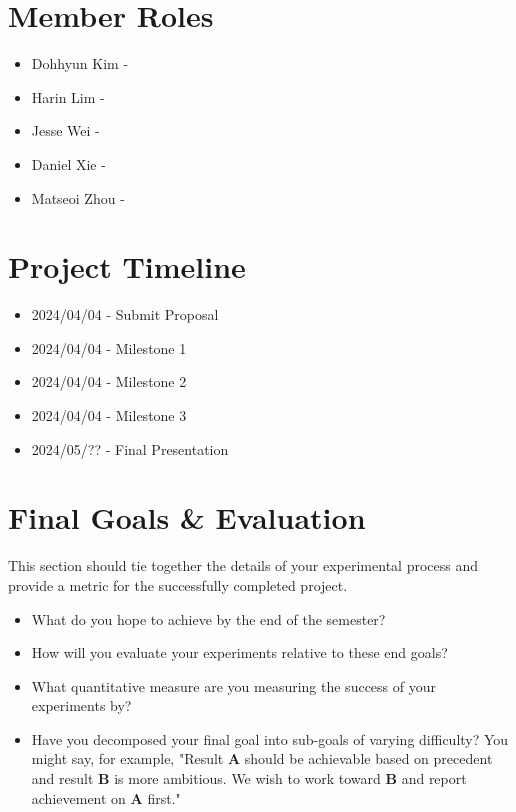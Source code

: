 \documentclass{article}
\begin{document}
\section{Member Roles}

\begin{itemize}
\item Dohhyun Kim - 
\item Harin Lim - 
\item Jesse Wei - 
\item Daniel Xie - 
\item Matseoi Zhou - 
\end{itemize}


\section{Project Timeline}

\begin{itemize}
\item 2024/04/04 - Submit Proposal 
\item 2024/04/04 - Milestone 1 
\item 2024/04/04 - Milestone 2  
\item 2024/04/04 - Milestone 3  
\item 2024/05/?? - Final Presentation 
\end{itemize}
\section{Final Goals \& Evaluation}

This section should tie together the details of your experimental process and provide a metric for the successfully completed project.

\begin{itemize}
\item What do you hope to achieve by the end of the semester?
\item How will you evaluate your experiments relative to these end goals?
\item What quantitative measure are you measuring the success of your experiments by?
\item Have you decomposed your final goal into sub-goals of varying difficulty? You might say, for example, "Result \textbf{A} should be achievable based on precedent and result \textbf{B} is more ambitious. We wish to work toward \textbf{B} and report achievement on \textbf{A} first."
\end{itemize}
\end{document}

